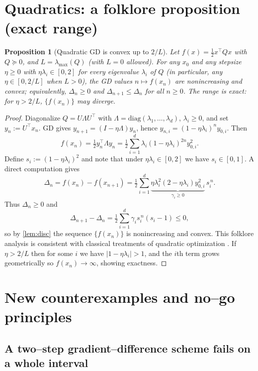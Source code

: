 \documentclass[11pt]{article}
\theoremstyle{plain}
\newtheorem{proposition}[theorem]{Proposition}
\theoremstyle{remark}
\begin{document}
\section{Quadratics: a folklore proposition (exact range)}

\begin{proposition}[Quadratic GD is convex up to $2/L$]\label{prop:quad}
Let $f(x)=\tfrac12 x^\top Qx$ with $Q\succeq0$, and $L=\lambda_{\max}(Q)$ (with $L=0$ allowed).
For any $x_0$ and any stepsize $\eta\ge0$ with $\eta\lambda_i\in[0,2]$ for every eigenvalue $\lambda_i$ of $Q$ (in particular, any $\eta\in[0,2/L]$ when $L>0$), the GD values $n\mapsto f(x_n)$ are nonincreasing and convex; equivalently, $\Delta_n\ge0$ and $\Delta_{n+1}\le \Delta_n$ for all $n\ge0$. The range is exact: for $\eta>2/L$, $\{f(x_n)\}$ may diverge.
\end{proposition}

\begin{proof}
Diagonalize $Q=U\Lambda U^\top$ with $\Lambda=\mathrm{diag}(\lambda_1,\dots,\lambda_d)$, $\lambda_i\ge0$, and set $y_n:=U^\top x_n$. GD gives $y_{n+1}=(I-\eta\Lambda)y_n$, hence $y_{n,i}=(1-\eta\lambda_i)^n y_{0,i}$. Then
\[
f(x_n)=\tfrac12 y_n^\top \Lambda y_n=\tfrac12\sum_{i=1}^d \lambda_i (1-\eta\lambda_i)^{2n} y_{0,i}^2.
\]
Define $s_i:=(1-\eta\lambda_i)^2$ and note that under $\eta\lambda_i\in[0,2]$ we have $s_i\in[0,1]$. A direct computation gives
\[
\Delta_n=f(x_n)-f(x_{n+1})=\tfrac12\sum_{i=1}^d \underbrace{\eta\lambda_i^2(2-\eta\lambda_i)y_{0,i}^2}_{\gamma_i\ge0}\, s_i^{\,n}.
\]
Thus $\Delta_n\ge0$ and
\[
\Delta_{n+1}-\Delta_n=\tfrac12\sum_{i=1}^d \gamma_i s_i^{\,n}(s_i-1)\le0,
\]
so by \cref{lem:disc} the sequence $\{f(x_n)\}$ is nonincreasing and convex. This folklore analysis is consistent with classical treatments of quadratic optimization \cite{Nesterov2004,Bubeck2015}. If $\eta>2/L$ then for some $i$ we have $|1-\eta\lambda_i|>1$, and the $i$th term grows geometrically so $f(x_n)\to\infty$, showing exactness.
\end{proof}

\section{New counterexamples and no--go principles}

\subsection{A two--step gradient--difference scheme fails on a whole interval}
\end{document}
